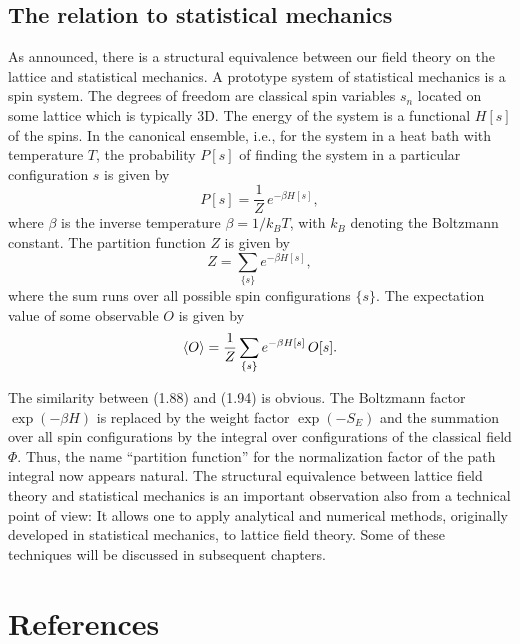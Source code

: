 \subsection{The relation to statistical mechanics}

As announced, there is a structural equivalence between our field theory on the
lattice and statistical mechanics. A prototype system of statistical mechanics
is a spin system. The degrees of freedom are classical spin variables $s_n$
located on some lattice which is typically 3D. The energy of the system is a
functional $H[s]$ of the spins. In the canonical ensemble, i.e., for the system
in a heat bath with temperature $T$, the probability $P[s]$ of finding the
system in a particular configuration $s$ is given by
\begin{equation}
  P[s] = \frac{1}{Z}\,e^{-\beta H[s]},
\end{equation}
where $\beta$ is the inverse temperature $\beta = 1/k_B T$, with $k_B$ denoting
the Boltzmann constant. The partition function $Z$ is given by
\begin{equation}
  Z = \sum_{\{s\}}e^{-\beta H[s]},
\end{equation}
where the sum runs over all possible spin configurations $\{s\}$. The
expectation value of some observable $O$ is given by
\begin{equation}
  \left\langle O \right\rangle = \frac{1}{Z}\sum_{\{s\}}e^{-\beta H[s]}\,O[s].
\end{equation}

The similarity between (1.88) and (1.94) is obvious. The Boltzmann factor
$\exp(-\beta H)$ is replaced by the weight factor $\exp(-S_E)$ and the
summation over all spin configurations by the integral over configurations of
the classical field $\Phi$. Thus, the name ``partition function'' for the
normalization factor of the path integral now appears natural. The structural
equivalence between lattice field theory and statistical mechanics is an
important observation also from a technical point of view: It allows one to
apply analytical and numerical methods, originally developed in statistical
mechanics, to lattice field theory. Some of these techniques will be discussed
in subsequent chapters.

\section*{References}

